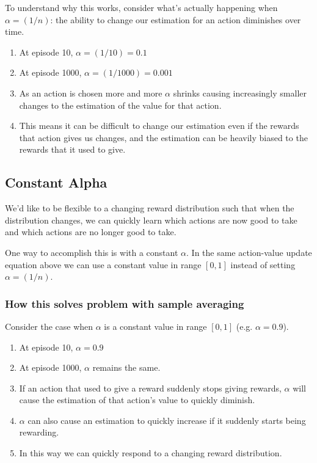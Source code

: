 To understand why this works, consider what’s actually happening when $\alpha = (1/n)$: the ability to change our estimation for an action diminishes over time.

\begin{enumerate}
    \item At episode 10, $\alpha = (1/10) = 0.1$
    \item At episode 1000, $\alpha = (1/1000) = 0.001$
    \item As an action is chosen more and more $\alpha$ shrinks causing increasingly smaller changes to the estimation of the value for that action.
    \item This means it can be difficult to change our estimation even if the rewards that action gives us changes, and the estimation can be heavily biased to the rewards that it used to give.
\end{enumerate}

\subsection{Constant Alpha \cite{medium-numsmt2-rl-ch2-part-3}}\label{MAB: Constant Alpha}

We’d like to be flexible to a changing reward distribution such that when the distribution changes, we can quickly learn which actions are now good to take and which actions are no longer good to take.

One way to accomplish this is with a constant $\alpha$. In the same action-value update equation above we can use a constant value in range $[0, 1]$ instead of setting $\alpha = (1/n)$.

\subsubsection{How this solves problem with sample averaging}
Consider the case when $\alpha$ is a constant value in range $[0, 1]$ (e.g. $\alpha = 0.9$).
\begin{enumerate}
    \item At episode 10, $\alpha = 0.9$
    \item At episode 1000, $\alpha$ remains the same.
    \item If an action that used to give a reward suddenly stops giving rewards, $\alpha$ will cause the estimation of that action’s value to quickly diminish.
    \item $\alpha$ can also cause an estimation to quickly increase if it suddenly starts being rewarding.
    \item In this way we can quickly respond to a changing reward distribution.
\end{enumerate}


